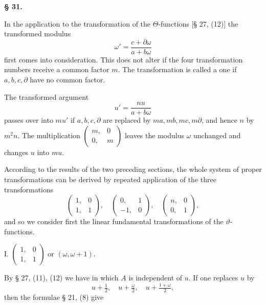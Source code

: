 \begin{center}
\textbf{§ 31. }
\end{center}

In the application to the transformation of the $\Theta$-functions
[§ 27, (12)] the transformed modulus
\[
\omega' = \dfrac{c + \partial\omega}{a + b\omega}
\]
first comes into consideration. This does not alter if the four transformation numbers
receive a common factor $m$. The
transformation is called a  one if $a, b, c, \partial$ have no
common factor.

The transformed argument
\[
u' = \dfrac{nu}{a + b\omega}
\]
passes over into $mu'$ if $a, b, c, \partial$ are replaced by $ma, mb, mc, m\partial$, and hence $n$
by $m^2n$. The multiplication $\begin{pmatrix}m, & 0\\0, & m\end{pmatrix}$ leaves the
modulus $\omega$ unchanged and changes $u$ into $mu$.

According to the results of the two preceding sections, the whole system of proper
transformations can be derived by repeated application of the three transformations
\[
\begin{pmatrix}1, & 0\\1, & 1\end{pmatrix}, \quad \begin{pmatrix}0, & 1\\-1, & 0\end{pmatrix}, \quad \begin{pmatrix}n, & 0\\0, & 1\end{pmatrix},
\]
and so we consider first the linear fundamental transformations
of the $\vartheta$-functions.

I. $\begin{pmatrix}1, & 0\\1, & 1\end{pmatrix}$ or $(\omega, \omega + 1)$.

By § 27, (11), (12) we have
in which $A$ is independent of $u$. If one replaces $u$ by
\[
u + \tfrac{1}{2}, \quad u + \tfrac{\omega}{2}, \quad u + \tfrac{1+\omega}{2},
\]
then the formulae § 21, (8) give
